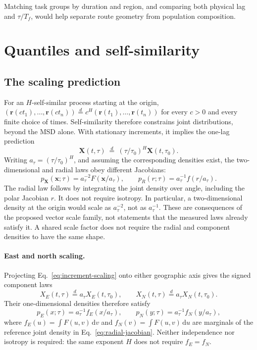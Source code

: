 Matching task groups by duration and region, and comparing both physical lag and
$\tau/T_f$, would help separate route geometry from population composition.


\FloatBarrier
\section{Quantiles and self-similarity}
\label{sec:transport-propagator}

\subsection{The scaling prediction}

For an $H$-self-similar process starting at the origin,
$(\mathbf r(ct_1),\ldots,\mathbf r(ct_n))\overset d=
c^H(\mathbf r(t_1),\ldots,\mathbf r(t_n))$ for every $c>0$ and every finite choice of
times. Self-similarity therefore constrains joint distributions, beyond the MSD alone. With stationary increments, it implies the one-lag
prediction
\begin{equation}
  \mathbf X(t,\tau)\ \overset{d}{=}\
       (\tau/\tau_0)^H\mathbf X(t,\tau_0).
  \label{eq:increment-scaling}
\end{equation}
Writing $a_\tau=(\tau/\tau_0)^H$, and assuming the corresponding densities exist,
the two-dimensional and radial laws obey different Jacobians:
\begin{equation}
  p_{\mathbf X}(\mathbf x;\tau)=a_\tau^{-2}F(\mathbf x/a_\tau),
  \qquad p_R(r;\tau)=a_\tau^{-1}f(r/a_\tau).
  \label{eq:radial-jacobian}
\end{equation}
The radial law follows by integrating the joint density over angle, including the polar
Jacobian $r$. It does not require isotropy. In particular, a two-dimensional density at
the origin would scale as $a_\tau^{-2}$, not as $a_\tau^{-1}$.
These are consequences of the proposed vector scale family, not statements
that the measured laws already satisfy it. A shared scale factor does not
require the radial and component densities to have the same shape.

\paragraph{East and north scaling.}
Projecting Eq.~\eqref{eq:increment-scaling} onto either geographic axis gives
the signed component laws
\begin{equation}
 X_E(t,\tau)\overset d=a_\tau X_E(t,\tau_0),\qquad
 X_N(t,\tau)\overset d=a_\tau X_N(t,\tau_0).
 \label{eq:component-increment-scaling}
\end{equation}
Their one-dimensional densities therefore satisfy
\begin{equation}
 p_E(x;\tau)=a_\tau^{-1}f_E(x/a_\tau),\qquad
 p_N(y;\tau)=a_\tau^{-1}f_N(y/a_\tau),
 \label{eq:component-density-scaling}
\end{equation}
where $f_E(u)=\int F(u,v)\,\mathrm dv$ and
$f_N(v)=\int F(u,v)\,\mathrm du$ are marginals of the reference joint density
in Eq.~\eqref{eq:radial-jacobian}. Neither independence nor isotropy is required:
the same exponent $H$ does not require $f_E=f_N$.


